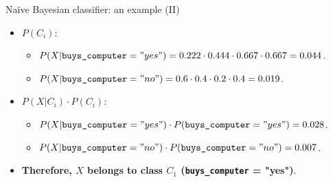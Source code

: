 \documentclass[aspectratio=169,t,table]{beamer}
\begin{document}
  {
    \begin{frame}{Naïve Bayesian classifier: an example (II)}
      \begin{itemize}
        \item $P(C_i)$:
        \begin{itemize}
          \item $P(X | \texttt{buys\_computer} = "yes") = 0.222 \cdot 0.444 \cdot 0.667 \cdot 0.667 = 0.044$.
          \item $P(X | \texttt{buys\_computer} = "no") = 0.6 \cdot 0.4 \cdot 0.2 \cdot 0.4 = 0.019$.
        \end{itemize}
        \item $P(X | C_i) \cdot P(C_i)$:
        \begin{itemize}
          \item $P(X | \texttt{buys\_computer} = "yes") \cdot  P(\texttt{buys\_computer} = "yes") = 0.028$.
          \item $P(X | \texttt{buys\_computer} = "no") \cdot  P(\texttt{buys\_computer} = "no") = 0.007$.
        \end{itemize}
        \item \textbf{Therefore, $X$ belongs to class $C_1$ (\texttt{buys\_computer} = "yes")}.
      \end{itemize}
    \end{frame}
  }
\end{document}
